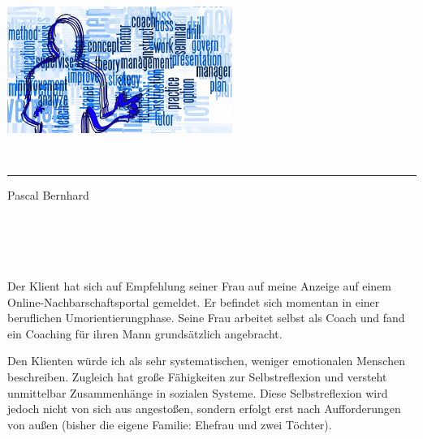 \documentclass[11pt,a4paper]{article}
\begin{document}
\sffamily   %
\hfill%
\begin{minipage}[t]{.6\textwidth}
\raggedleft%
\includegraphics[width=0.55\textwidth]{Coaching-Logo_1280-720.jpg}


\end{minipage}\\[0.5em]
%
{\color{firstnamecolor}\rule{\textwidth}{.25ex}}
%
\begin{minipage}[t]{.4\textwidth}
	\raggedright%
	\vspace*{1em}

	\small%
\end{minipage}
%
\hfill
%
\begin{minipage}[t]{.4\textwidth}
	\raggedleft %
	Pascal Bernhard
\end{minipage}\\[2.2em]


{\bfseries {}}\\[0.75em]

\section*{\color{MidnightBlue}{Rahmeninformationen zum Klienten}}


Der Klient hat sich auf Empfehlung seiner Frau auf meine Anzeige auf einem Online-Nachbarschaftsportal gemeldet. Er befindet sich momentan in einer beruflichen Umorientierungphase. Seine Frau arbeitet selbst als Coach und fand ein Coaching für ihren Mann grundsätzlich angebracht.

Den Klienten würde ich als sehr systematischen, weniger emotionalen Menschen beschreiben. Zugleich hat große Fähigkeiten zur Selbstreflexion und versteht unmittelbar Zusammenhänge in sozialen Systeme. Diese Selbstreflexion wird jedoch nicht von sich aus angestoßen, sondern erfolgt erst nach Aufforderungen von außen (bisher die eigene Familie: Ehefrau und zwei Töchter).
\end{document}
